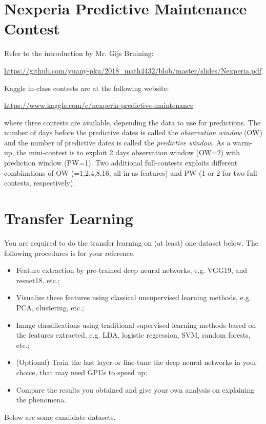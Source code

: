 \documentclass[11pt]{article}
\begin{document}
\section{Nexperia Predictive Maintenance Contest}

Refer to the introduction by Mr. Gijs Bruining:

\url{https://github.com/yuany-pku/2018_math4432/blob/master/slides/Nexperia.pdf}

Kaggle in-class contests are at the following website:

\url{https://www.kaggle.com/c/nexperia-predictive-maintenance}

\noindent where three contests are available, depending the data to use for predictions. The number of days before the predictive dates is called the \emph{observation window} (OW) and the number of predictive dates is called the \emph{predictive window}. As a warm-up, the mini-contest is to exploit 2 days observation window (OW=2) with prediction window (PW=1). Two additional full-contests exploits different combinations of OW (=1,2,4,8,16, all in as features) and PW (1 or 2 for two full-contests, respectively). 
 

\section{Transfer Learning}

You are required to do the transfer learning on (at least) one dataset below. The following procedures is for your reference.

\begin{itemize}
\item Feature extraction by pre-trained deep neural networks, e.g. VGG19, and resnet18, etc.;
\item Visualize these features using classical unsupervised learning methods, e.g. PCA, clustering, etc.; 
\item Image classifications using traditional supervised learning methods based on the features extracted, e.g. LDA, logistic regression, SVM, random forests, etc.;
\item (Optional) Train the last layer or fine-tune the deep neural networks in your choice, that may need GPUs to speed up; 
\item Compare the results you obtained and give your own analysis on explaining the phenomena.
\end{itemize}

Below are some candidate datasets. 
\end{document}
